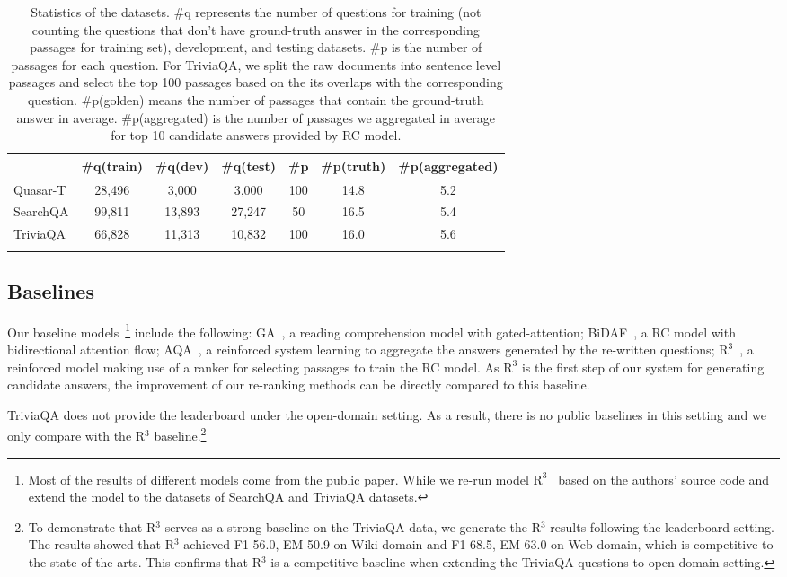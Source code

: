 \documentclass{article} \usepackage{iclr2018_conference,times}
\begin{document}
\begin{table}[]
\centering
\small
\setlength\tabcolsep{3.5pt}
\begin{tabular}{lcccccc}
\toprule
            & \#q(train) & \#q(dev) & \#q(test)  & \#p & \#p(truth) & \#p(aggregated)\\
\midrule
Quasar-T    & 28,496 & 3,000 & 3,000  &  100 & 14.8 & 5.2 \\
SearchQA       & 99,811 & 13,893 & 27,247 & 50 & 16.5 & 5.4 \\
TriviaQA  & 66,828 & 11,313 & 10,832 & 100 & 16.0 & 5.6 \\
\bottomrule
\normalsize
\end{tabular}
\caption{Statistics of the datasets. \#q represents the number of questions for training (not counting the questions that don't have ground-truth answer in the corresponding passages for training set), development, and testing datasets. \#p is the number of passages for each question. For TriviaQA, we split the raw documents into sentence level passages and select the top 100 passages based on the its overlaps with the corresponding question.  \#p(golden) means the number of passages that contain the ground-truth answer in average. \#p(aggregated) is the number of passages we aggregated in average for top 10 candidate answers provided by RC model.}
\label{datasets}
\end{table}

\subsection{Baselines}
Our baseline models~\footnote{ Most of the results of different models come from the public paper. While we re-run model $\text{R}^3$~\citep{wang2017r} based on the authors' source code and extend the model to the datasets of SearchQA and TriviaQA datasets.} include the following: GA~\citep{dhingra2016gated,dhingra2017quasar}, a reading comprehension model with gated-attention; BiDAF~\citep{seo2016bidirectional}, a RC model with bidirectional attention flow; AQA~\citep{buck2017ask}, a reinforced system learning to aggregate the answers generated by the re-written questions; $\text{R}^3$~\citep{wang2017r}, a reinforced model making use of a ranker for selecting passages to train the RC model. As $\text{R}^3$ is the first step of our system for generating candidate answers, the improvement of our re-ranking methods can be directly compared to this baseline.

TriviaQA does not provide the leaderboard under the open-domain setting. As a result, there is no public baselines in this setting and we only compare with the R$^3$ baseline.\footnote{To demonstrate that R$^3$ serves as a strong baseline on the TriviaQA data, we generate the R$^3$ results following the leaderboard setting. The results showed that R$^3$ achieved F1 56.0, EM 50.9 on Wiki domain and F1 68.5, EM 63.0 on Web domain, which is competitive to the state-of-the-arts. This confirms that R$^3$ is a competitive baseline when extending the TriviaQA questions to open-domain setting.}
\end{document}

